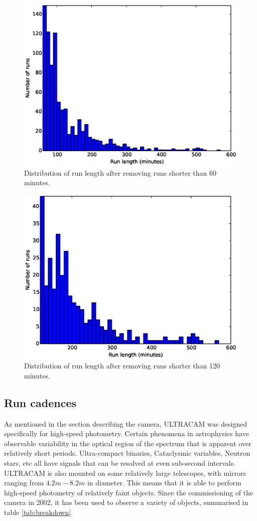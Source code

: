 \begin{figure}[!h]
  \centering
  \includegraphics[width=120mm]{images/hist60-600.eps}
  \caption{Distribution of run length after removing runs shorter than 60 minutes.}
  \label{fig:histogram60-600}
\end{figure}


\begin{figure}[!h]
  \centering
  \includegraphics[width=120mm]{images/hist120-600.eps}
  \caption{Distribution of run length after removing runs shorter than 120 minutes.}
  \label{fig:histogram120-600}
\end{figure}

\subsection{Run cadences}
As mentioned in the section describing the camera, ULTRACAM was designed specifically for high-speed photometry. Certain phenomena in astrophysics have observable variability in the optical region of the spectrum that is apparent over relatively short periods. Ultra-compact binaries, Cataclysmic variables, Neutron stars, etc all have signals that can be resolved at even sub-second intervals. ULTRACAM is also mounted on some relatively large telescopes, with mirrors ranging from $4.2m - 8.2m$ in diameter. This means that it is able to perform high-speed photometry of relatively faint objects. Since the commissioning of the camera in 2002, it has been used to observe a variety of objects, summarised in table \ref{tab:breakdown}. 

